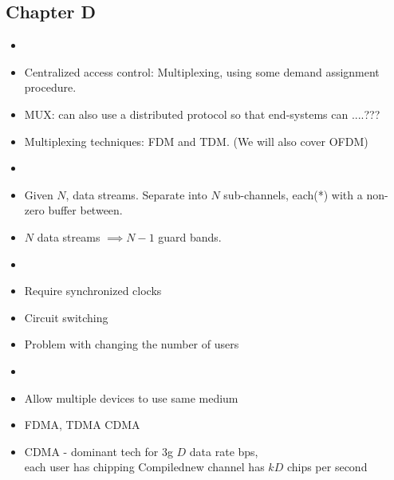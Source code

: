 \documentclass[../../main.tex]{subfiles}
\begin{document}
\subsection{Chapter D}
\begin{wtr}
    \begin{itemize}
    \item[]
    \item Centralized access control: Multiplexing, using some demand assignment procedure.
    \item MUX: can also use a distributed protocol so that end-systems can ....???
    \item Multiplexing techniques: FDM and TDM. (We will also cover OFDM)
    \end{itemize}
\end{wtr}
\begin{wtr}[FDM]
    \begin{itemize}
        \item[]
        \item Given $N$, data streams. Separate into $N$ sub-channels, each(*) with a non-zero buffer between.
        \item $N$ data streams $\implies N-1$ guard bands.
    \end{itemize}
\end{wtr}

\begin{wtr}[OFDM]

\end{wtr}
\begin{wtr}[TDM]
\begin{itemize}
    \item[]
    \item Require synchronized clocks
    \item Circuit switching
    \item Problem with changing the number of users
\end{itemize}
\end{wtr}

\begin{wtr}
\begin{itemize}
    \item[]
    \item Allow multiple devices to use same medium
    \item FDMA, TDMA CDMA
    \item CDMA - dominant tech for 3g
    $D$ data rate bps,\\
    each user has chipping Compilednew channel has $kD$ chips per second
\end{itemize}
\end{wtr}
\end{document}
